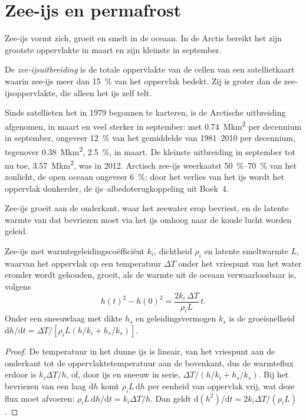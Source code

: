 \section{Zee-ijs en permafrost}\label{sec:b3:glaciology:sea-ice}

Zee-ijs vormt zich, groeit en smelt in de oceaan. In de Arctis bereikt het zijn
grootste oppervlakte in maart en zijn kleinste in september.

\begin{definition}\label{def:b3:glaciology:sea-ice}
De \emph{zee-ijsuitbreiding} is de totale oppervlakte van de
cellen van een satellietkaart waarin zee-ijs meer dan
\qty{15}{\percent} van het oppervlak bedekt. Zij is groter dan de zee-ijsoppervlakte,
die alleen het ijs zelf telt.
\end{definition}

Sinds satellieten het in 1979 begonnen te karteren, is de Arctische uitbreiding afgenomen, in
maart en veel sterker in september: met \qty{0.74}{\mega km^2} per decennium in
september, ongeveer \qty{12}{\percent} van het gemiddelde van 1981--2010 per decennium, tegenover
\qty{0.38}{\mega km^2}, \qty{2.5}{\percent}, in maart. De kleinste
uitbreiding in september tot nu toe, \qty{3.57}{\mega km^2}, was in 2012. Arctisch zee-ijs
weerkaatst \qtyrange{50}{70}{\percent} van het zonlicht, de open oceaan
ongeveer \qty{6}{\percent}: door het verlies van het ijs wordt het oppervlak donkerder, de ijs--albedoterugkoppeling
uit Boek~4.

Zee-ijs groeit aan de onderkant, waar het zeewater erop bevriest, en de latente
warmte van dat bevriezen moet via het ijs omhoog naar de koude lucht worden geleid.

\begin{theorem}\label{thm:b3:glaciology:stefan}
Zee-ijs met warmtegeleidingscoëfficiënt $k_i$, dichtheid $\rho_i$ en latente
smeltwarmte $L$, waarvan het oppervlak op een temperatuur $\Delta T$ onder het
vriespunt van het water eronder wordt gehouden, groeit, als de warmte uit de
oceaan verwaarloosbaar is, volgens
\[
h(t)^2 - h(0)^2 = \frac{2k_i\,\Delta T}{\rho_iL}\,t .
\]
Onder een sneeuwlaag met dikte $h_s$ en geleidingsvermogen $k_s$ is de groeisnelheid
$\mathrm dh/\mathrm dt = \Delta T/[\rho_iL(h/k_i + h_s/k_s)]$.
\end{theorem}

\begin{proof}
De temperatuur in het dunne ijs is lineair, van het vriespunt aan de onderkant tot
de oppervlaktetemperatuur aan de bovenkant, dus de warmteflux erdoor is
$k_i\Delta T/h$, of, door ijs en sneeuw in serie, $\Delta T/(h/k_i +
h_s/k_s)$. Bij het bevriezen van een laag $\mathrm dh$ komt $\rho_iL\,\mathrm dh$ per
eenheid van oppervlak vrij, wat deze flux moet afvoeren: $\rho_iL\,\mathrm dh/\mathrm dt
= k_i\Delta T/h$. Dan geldt $\mathrm d(h^2)/\mathrm dt = 2k_i\Delta T/(\rho_iL)$.
\end{proof}

